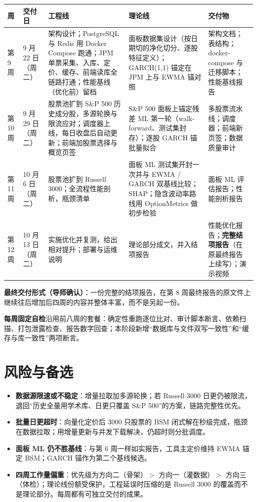 \documentclass[11pt]{ctexart}
\begin{document}
\begin{center}\small
\begin{tabular}{p{1.3cm}p{1.8cm}p{4.5cm}p{3.5cm}p{3.5cm}}
\toprule
周 & 交付日 & 工程线 & 理论线 & 交付物 \\
\midrule
第 9 周 & 9 月 22 日（周二） & 架构设计；PostgreSQL 与 Redis 用 Docker Compose 跑通；JPM 单票采集、入库、定价、缓存、前端读库全链路打通；性能基线（优化前）留档 & 面板数据集设计（按日期切的净化切分、逐股特征定义）；GARCH(1,1) 锚定在 JPM 上与 EWMA 锚对照 & 架构文档；表结构；docker-compose 与迁移脚本；性能基线报告 \\
\addlinespace
第 10 周 & 9 月 29 日（周二） & 股票池扩到 S\&P 500 历史成分股，多源轮换与限流应对；调度器上线，每日收盘后自动更新；前端加股票选择与概览页签 & S\&P 500 面板上锚定残差 ML 第一轮（walk-forward、测试集封存）；逐股 GARCH 锚批量拟合 & 多股票流水线；调度器；前端新页签；数据质量审计 \\
\addlinespace
第 11 周 & 10 月 6 日（周二） & 股票池扩到 Russell 3000；全流程性能剖析，瓶颈清单 & 面板 ML 测试集开封一次并与 EWMA / GARCH 双基线比较；SHAP；隐含波动率路线用 OptionMetrics 做初步检验 & 面板 ML 评估报告；性能剖析报告 \\
\addlinespace
第 12 周 & 10 月 13 日（周二） & 实施优化并复测，给出相对提升；部署与运维说明 & 理论部分成文，并入结项报告 & 性能优化报告；\textbf{完整结项报告}（在原最终报告上续写）；演示视频 \\
\bottomrule
\end{tabular}
\end{center}

\textbf{最终交付形式（导师确认）}：一份完整的结项报告，在第 8 周最终报告的原文件上继续往后增加后四周的内容并整体丰富，而不是另起一份。

\textbf{每周固定自检}沿用前八周的套餐：确定性重跑逐位比对、审计脚本断言、依赖扫描、打包泄露检查、报告数字回查；本阶段新增“数据库与文件双写一致性”和“缓存与库一致性”两项断言。

\section{风险与备选}

\begin{itemize}
  \item \textbf{数据源限速或不稳定}：增量拉取加多源轮换；若 Russell 3000 日更仍被限流，退回“历史全量用学术库、日更只覆盖 S\&P 500”的方案，链路完整性优先。
  \item \textbf{批量日更超时}：向量化定价后 3000 只股票的 BSM 闭式解在秒级完成，瓶颈在数据拉取；用增量更新与并发下载解决，仍超时则分批调度。
  \item \textbf{面板 ML 仍不胜基线}：与第 6 周一样如实报告，工具主定价维持 EWMA 锚定 BSM；GARCH 锚作为第二个基线候选。
  \item \textbf{四周工作量偏重}：优先级为方向二（骨架）$>$ 方向一（灌数据）$>$ 方向三（体检）；理论线份额受保护，工程延误时压缩的是 Russell 3000 的覆盖而不是理论部分。每周都有可独立交付的成果。
\end{itemize}
\end{document}
